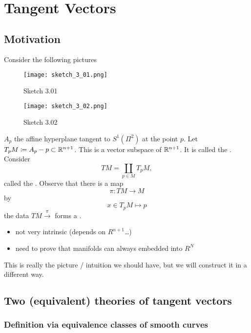 \chapter{Tangent Vectors}

\section{Motivation}

Consider the following pictures 
\begin{figure}[H]
    \centering
    \texttt{[image: sketch\_3\_01.png]}
    \caption{Sketch 3.01}
\end{figure}
\begin{figure}[H]
    \centering
    \texttt{[image: sketch\_3\_02.png]}
    \caption{Sketch 3.02}
\end{figure}
\(A_p\) the affine hyperplane tangent to \(S^1 (\Pi^2)\) at the point \(p\).
Let \(T_p M\coloneqq A_p-p\subset\mathbb{R}^{n+1}\). This is a vector subspace of \(\mathbb{R}^{n+1}\).
It is called the . Consider \[TM=\coprod_{p\in M} T_pM,\]
called the . Observe that there is a map 
\[\pi:TM\to M\]
by 
\[x\in T_p M\mapsto p\]
the data \(TM\stackrel{\pi}{\to}\) forms a .


\begin{itemize}
    \item not very intrinsic (depends on \(R^{n+1}\)\dots) 
    \item need to prove that manifolds can always embedded into \(R^N\)
\end{itemize}

This is really the picture / intuition we should have, but we will construct it in a different way.

\section{Two (equivalent) theories of tangent vectors} 

\subsection{Definition via equivalence classes of smooth curves}

